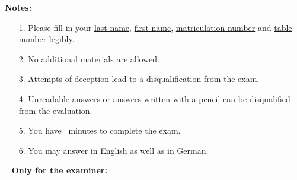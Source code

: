 \textbf{Notes:}

\begin{itemize}
	\item[1.] Please fill in your \underline{last name}, \underline{first name}, \underline{matriculation number} and \underline{table number} legibly.
	\item[2.] No additional materials are allowed.
	\item[3.] Attempts of deception lead to a disqualification from the exam.
	\item[4.] Unreadable answers or answers written with a pencil can be disqualified from the evaluation.
	\item[5.] You have \klausurminuten\ minutes to complete the exam.
	\item[6.] You may answer in English as well as in German.
\end{itemize}
~
\smallbreak
{\footnotesize
\textbf{Only for the examiner:}
}

\def\myline{%
    \stepcounter{countA}\ifthenelse{\the\numexpr\value{countA}-1<\themaxAufgabenNum}{\thecountA}{-}&
    \ifnum\thecountA<9\myline\fi
}

